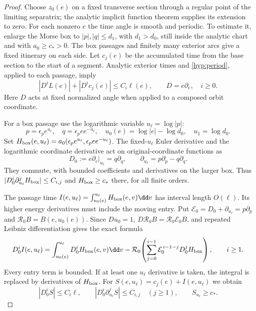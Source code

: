 \begin{proof}
Choose $z_0(e)$ on a fixed transverse section through a regular point
of the limiting separatrix; the analytic implicit function theorem
supplies its extension to zero.  For each nonzero $e$ the time angle
is smooth and periodic.  To estimate it, enlarge the Morse box to
$|p|,|q|\le d_1$, with $d_1>d_0$, still inside the analytic chart and
with $a_0\ge c_*>0$.  The box passages and finitely many exterior arcs
give a fixed itinerary on each side.  Let $c_j(e)$ be the accumulated
time from the base section to the start of a segment.  Analytic
exterior times and \eqref{hyp:period}, applied to each passage, imply
\begin{equation}\label{hyp:euler-times}
 |D^i L(e)|+|D^i c_j(e)|\le C_i\ell(e),\qquad
 D=e\partial_e,\quad i\ge0.
\end{equation}
Here $D$ acts at fixed normalized angle when applied to a composed
orbit coordinate.

For a box passage use the logarithmic variable $u_\ell=\log|p|$:
\[
 p=\epsilon_p e^{u_\ell},\quad
 q=\epsilon_p e e^{-u_\ell},\quad
 u_0(e)=\log|e|-\log d_0,\quad u_1=\log d_0.
\]
Set $H_{\rm box}(e,u_\ell)=a_0(\epsilon_p e^{u_\ell},\epsilon_p e e^{-u_\ell})$.
The fixed-$u_\ell$ Euler derivative and the logarithmic coordinate
derivative act on original-coordinate functions as
\[
 D_0:=e\partial_e|_{u_\ell}=q\partial_q,\qquad
 \partial_{u_\ell}=p\partial_p-q\partial_q.
\]
They commute, with bounded coefficients and derivatives on the
larger box.  Thus $|D_0^i\partial_{u_\ell}^jH_{\rm box}|\le C_{i,j}$ and $H_{\rm box}\ge c_*$
there, for all finite orders.

The passage time $I(e,u_\ell)=\int_{u_0(e)}^{u_\ell}H_{\rm box}(e,v)\dd v$ has interval
length $O(\ell)$.  Its higher energy derivatives must include the
moving entry.  Put $\mathcal E_0=D_0+\partial_{u_\ell}=p\partial_p$ and
$\mathcal R_0B=B(e,u_0(e))$.  Since $Du_0=1$,
$D\mathcal R_0B=\mathcal R_0\mathcal E_0B$, and repeated Leibniz
differentiation gives the exact formula
\begin{equation}\label{hyp:moving-entry}
 D_0^i I(e,u_\ell)=\int_{u_0(e)}^{u_\ell}D_0^iH_{\rm box}(e,v)\dd v
 -\mathcal R_0\!\left(
     \sum_{j=0}^{i-1}\mathcal E_0^{\,i-1-j}D_0^jH_{\rm box}\right),
 \qquad i\ge1.
\end{equation}
Every entry term is bounded.  If at least one $u_\ell$ derivative is taken,
the integral is replaced by derivatives of $H_{\rm box}$.  For
$S(e,u_\ell)=c_j(e)+I(e,u_\ell)$ we obtain
\begin{equation}\label{hyp:time-symbols}
 |D_0^iS|\le C_i\ell,\qquad
 |D_0^i\partial_{u_\ell}^jS|\le C_{i,j}\quad(j\ge1),\qquad S_{u_\ell}\ge c_*.
\end{equation}


\end{proof}
